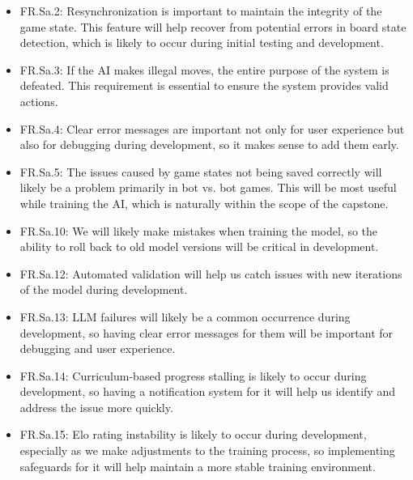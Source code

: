 \documentclass{article}
\begin{document}
\begin{itemize}
    \item FR.Sa.2: Resynchronization is important to maintain the integrity of the game state.
          This feature will help recover from potential errors in board state detection, which is likely to occur during initial testing and development.
    \item FR.Sa.3: If the AI makes illegal moves, the entire purpose of the system is defeated.
          This requirement is essential to ensure the system provides valid actions.
    \item FR.Sa.4: Clear error messages are important not only for user experience but also for debugging during development, so it makes sense to add them early.
    \item FR.Sa.5: The issues caused by game states not being saved correctly will likely be a problem primarily in bot vs. bot games.
          This will be most useful while training the AI, which is naturally within the scope of the capstone.
    \item FR.Sa.10: We will likely make mistakes when training the model, so the ability to roll back to old model versions will be critical in development.
    \item FR.Sa.12: Automated validation will help us catch issues with new iterations of the model during development.
    \item FR.Sa.13: LLM failures will likely be a common occurrence during development, so having clear error messages for them will be important for debugging and user experience.
    \item FR.Sa.14: Curriculum-based progress stalling is likely to occur during development, so having a notification system for it will help us identify and address the issue more quickly.
    \item FR.Sa.15: Elo rating instability is likely to occur during development, especially as we make adjustments to the training process, so implementing safeguards for it will help maintain a more stable training environment.
\end{itemize}
\end{document}

